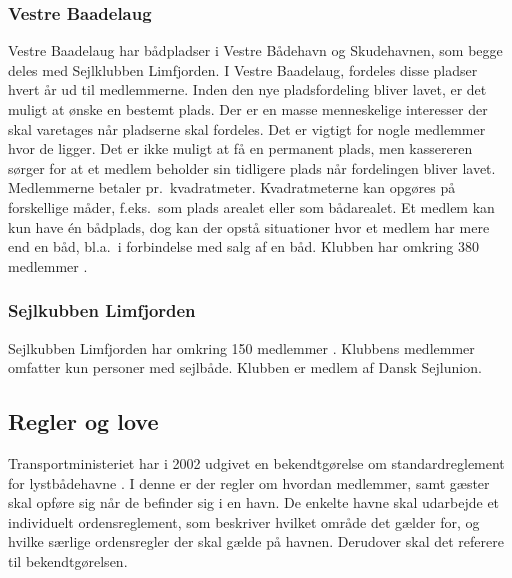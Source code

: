 \subsubsection{Vestre Baadelaug}
Vestre Baadelaug har bådpladser i Vestre Bådehavn og Skudehavnen, som begge deles med Sejlklubben Limfjorden. I Vestre Baadelaug, fordeles disse pladser hvert år ud til medlemmerne. Inden den nye pladsfordeling bliver lavet, er det muligt at ønske en bestemt plads. Der er en masse menneskelige interesser der skal varetages når pladserne skal fordeles. Det er vigtigt for nogle medlemmer hvor de ligger. Det er ikke muligt at få en permanent plads, men kassereren sørger for at et medlem beholder sin tidligere plads når fordelingen bliver lavet. Medlemmerne betaler pr.\ kvadratmeter. Kvadratmeterne kan opgøres på forskellige måder, f.eks.\ som plads arealet eller som bådarealet. Et medlem kan kun have én bådplads, dog kan der opstå situationer hvor et medlem har mere end en båd, bl.a.\ i forbindelse med salg af en båd. Klubben har omkring 380 medlemmer \cite{int_vb_sl}.


\subsubsection{Sejlkubben Limfjorden}
Sejlkubben Limfjorden har omkring 150 medlemmer \cite{int_vb_sl}. Klubbens medlemmer omfatter kun personer med sejlbåde. Klubben er medlem af Dansk Sejlunion.


\subsection{Regler og love}
Transportministeriet har i 2002 udgivet en bekendtgørelse om standardreglement for lystbådehavne \cite{standardreglement}. I denne er der regler om hvordan medlemmer, samt gæster skal opføre sig når de befinder sig i en havn. De enkelte havne skal udarbejde et individuelt ordensreglement, som beskriver hvilket område det gælder for, og hvilke særlige ordensregler der skal gælde på havnen. Derudover skal det referere til bekendtgørelsen.

